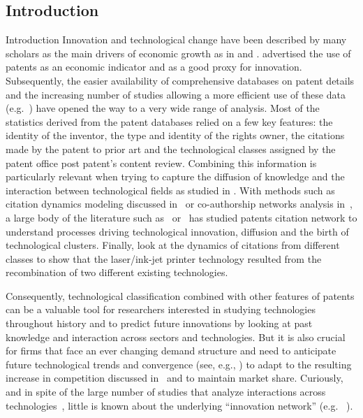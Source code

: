 \subsection*{Introduction}{Introduction}
Innovation and technological change have been described by many scholars as the main drivers of economic growth as in \cite{aghionhowitt1992} and \cite{romer1990}. \cite{RePEc:nbr:nberwo:3301} advertised the use of patents as an economic indicator and as a good proxy for innovation. Subsequently, the easier availability of comprehensive databases on patent details and the increasing number of studies allowing a more efficient use of these data (e.g.~\cite{Hall2001}) have opened the way to a very wide range of analysis. Most of the statistics derived from the patent databases relied on a few key features: the identity of the inventor, the type and identity of the rights owner, the citations made by the patent to prior art and the technological classes assigned by the patent office post patent's content review. Combining this information is particularly relevant when trying to capture the diffusion of knowledge and the interaction between technological fields as studied in \cite{Youn:2015fk}. With methods such as citation dynamics modeling discussed in~\cite{2013arXiv1310.8220N} or co-authorship networks analysis in~\cite{2014arXiv1402.7268S}, a large body of the literature such as~\cite{sorenson2006complexity} or~\cite{kay2014patent} has studied patents citation network to understand processes driving technological innovation, diffusion and the birth of technological clusters. Finally, \cite{bruck2016recognition} look at the dynamics of citations from different classes to show that the laser/ink-jet printer technology resulted from the recombination of two different existing technologies. 

Consequently, technological classification combined with other features of patents can be a valuable tool for researchers interested in studying technologies throughout history and to predict future innovations by looking at past knowledge and interaction across sectors and technologies. But it is also crucial for firms that face an ever changing demand structure and need to anticipate future technological trends and convergence (see, e.g., \cite{curran2011patent}) to adapt to the resulting increase in competition discussed in~\cite{Katz1996remarks} and to maintain market share. Curiously, and in spite of the large number of studies that analyze interactions across technologies~\cite{Furman2011shoulders}, little is known about the underlying ``innovation network'' (e.g. ~\cite{AAKnetwork2016}). 

